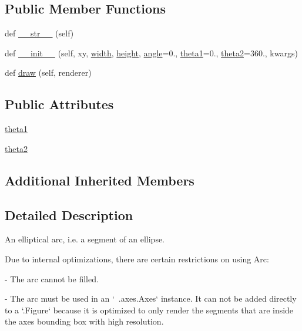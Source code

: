 \subsection*{Public Member Functions}
\begin{DoxyCompactItemize}
\item 
def \hyperlink{classmatplotlib_1_1patches_1_1Arc_ad2c4d99ff99e693762005044d0bfadec}{\+\_\+\+\_\+str\+\_\+\+\_\+} (self)
\item 
def \hyperlink{classmatplotlib_1_1patches_1_1Arc_a7330a32b95ef688e532904dd4a70f7cc}{\+\_\+\+\_\+init\+\_\+\+\_\+} (self, xy, \hyperlink{classmatplotlib_1_1patches_1_1Ellipse_a60c9f834917ca71a1ca9f92d6e5b7986}{width}, \hyperlink{classmatplotlib_1_1patches_1_1Ellipse_a0f3d6d29727e93758c785abd6b14abea}{height}, \hyperlink{classmatplotlib_1_1patches_1_1Ellipse_a36ada1e22adc07aa2c4a753a272f8f62}{angle}=0., \hyperlink{classmatplotlib_1_1patches_1_1Arc_afedb04eda7b2c8b3d9faca286376e941}{theta1}=0., \hyperlink{classmatplotlib_1_1patches_1_1Arc_aa51cfe8105d94d19d218334c562fc00d}{theta2}=360., kwargs)
\item 
def \hyperlink{classmatplotlib_1_1patches_1_1Arc_abd7a44ef09b65a789bda801515180220}{draw} (self, renderer)
\end{DoxyCompactItemize}
\subsection*{Public Attributes}
\begin{DoxyCompactItemize}
\item 
\hyperlink{classmatplotlib_1_1patches_1_1Arc_afedb04eda7b2c8b3d9faca286376e941}{theta1}
\item 
\hyperlink{classmatplotlib_1_1patches_1_1Arc_aa51cfe8105d94d19d218334c562fc00d}{theta2}
\end{DoxyCompactItemize}
\subsection*{Additional Inherited Members}


\subsection{Detailed Description}
\begin{DoxyVerb}An elliptical arc, i.e. a segment of an ellipse.

Due to internal optimizations, there are certain restrictions on using Arc:

- The arc cannot be filled.

- The arc must be used in an `~.axes.Axes` instance. It can not be added
  directly to a `.Figure` because it is optimized to only render the
  segments that are inside the axes bounding box with high resolution.
\end{DoxyVerb}
 

